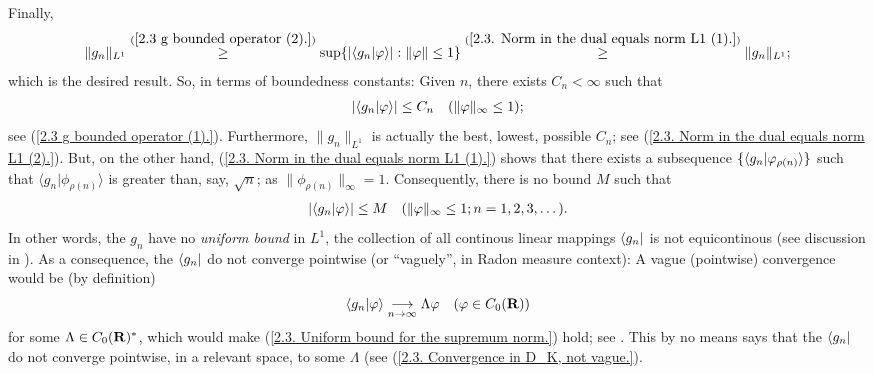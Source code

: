 %
Finally, %
%
  \begin{align}\label{2.3. Norm in the dual equals norm L1 (2).}
    \| g_n\|_{L^{1}}
      \overset{(\ref{2.3  g  bounded operator (2).})}{\geq}
    \sup\{
    \left\lvert \bra{g_n}\ket{\varphi} \right\rvert
    : 
      \| \varphi \| \leq 1
    \} 
      \overset{(\ref{2.3. Norm in the dual equals norm L1 (1).})}{\geq} 
    \| g_n\|_{L^{1}};
  \end{align}  %
%
which is the desired result. %
%
So, in terms of boundedness constants: %
Given $n$, there exists $C_{n} < \infty$ such that 
    \begin{align}\label{2.3. Optimal bound.}
      \left\lvert 
        \bra{g_n}\ket{\varphi} 
      \right\rvert 
        \leq 
      C_{n} \quad (\| \varphi \|_\infty \leq 1); 
    \end{align}
see (\ref{2.3  g  bounded operator (1).}). 
Furthermore, %
%
  $\|g_n\|_{L^1}$ is actually the best, \ie lowest, possible $C_{n}$; see %
    (\ref{2.3. Norm in the dual equals norm L1 (2).}). %
But, on the other hand, %
%
  (\ref{2.3. Norm in the dual equals norm L1 (1).}) %
%
shows that there exists a subsequence %
%
  $\{\langle{g_n}\lvert{\varphi_{\rho(n)}}\rangle\}$ %
%
such that %
%
  $\langle{g_n}\lvert{\phi_{\rho(n)}}\rangle$ %
% 
is greater than, say, $\sqrt{n} $; as $\| \phi_{\rho(n)} \|_\infty = 1$. %
%
Consequently, there is no bound $M$ such that %
%
  \begin{align}\label{2.3. Uniform bound for the supremum norm.}
    \left\lvert 
      \bra{g_n}\ket{\varphi} 
    \right\rvert 
      \leq M
    \quad (\| \varphi \|_\infty \leq 1; n=1, 2, 3, \dots).
  \end{align}
%
In other words, the $g_n$ have no \textit{uniform bound} in ${L^1}$, %
  \ie %
the collection of all continous linear mappings %
%
  $\bra{g_n}$ %
%
is not equicontinous %
%
  (see discussion in ). %
%
As a consequence, %
%
  the $\bra{g_n}$ %
%
do not converge pointwise (or ``vaguely'', in Radon measure context): %
A vague (\ie pointwise) convergence would be (by definition) %
%
  \begin{align}
    \bra{g_n}\ket{\phi} \tendsto{n}{\infty} \Lambda \phi %
    \quad (\phi \in C_0(\R)) %
  \end{align}
%
for some $\Lambda\in C_0({\mathbf R})^\ast$, which would make %
%
  (\ref{2.3. Uniform bound for the supremum norm.})
%
hold; see . %
%
This by no means says that the %
%
  $\bra{g_n}$ %
%
do not converge pointwise, in a relevant space, to some $\Lambda$ (see %
%
  (\ref{2.3. Convergence in D_K, not vague.}). %
%
\newline\newline\noindent
